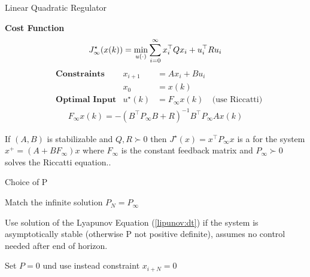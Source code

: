 \begin{sstTitleBox}{
    Linear Quadratic Regulator
  }
  \begin{sstOnlyFrame}
    \textbf{Cost Function}
    \vspace{-3mm}
    \begin{equation}
      J_\infty^\star(x(k)) =
      \min_{u(\cdot)} \sum_{i=0}^\infty
      x_i^\top Q x_i + u_i^\top R u_i                                   \\
    \end{equation}
    \vspace{-5mm}
    \begin{align*}
      & \textbf{Constraints}
      & x_{i+1}                & = Ax_i + Bu_i
      \\
      &                        & x_0             & = x(k)
      \\
      & \textbf{Optimal Input}
      & u^\star(k)             & = F_\infty x(k)
      & \text{(use Riccatti)}
    \end{align*}
    \vspace{-5mm}
    \begin{align*}
      F_\infty x(k)    =           - (B^\top P_\infty B + R)^{-1}
      B^\top P_\infty A x(k)
    \end{align*}
  \end{sstOnlyFrame}
  \begin{sstOnlyFrame}
    \begin{lemma}
      If $(A,B)$ is stabilizable
      and $Q,R \succ 0$ then
      $J^\star(x) = x^\top P_\infty x$
      is a 
      for the system $x^+ = (A+BF_\infty)x$
      where $F_\infty$ is the constant feedback matrix
      and $P_\infty \succ 0$ solves the Riccatti equation..
    \end{lemma}

  \end{sstOnlyFrame}
\end{sstTitleBox}

\begin{sstTitleBox}[BrickRed]{
    Choice of P
  }
  \begin{sstOnlyFrame}[BrickRed]
    Match the infinite solution $P_N = P_\infty$

    Use solution of the Lyapunov Equation (\ref{lipunov:dt})
    if the system is asymptotically stable
    (otherwise P not positive definite),
    assumes no control needed after end of horizon.

    Set $P=0$ und use instead constraint $x_{i+N}=0$
  \end{sstOnlyFrame}
\end{sstTitleBox}
